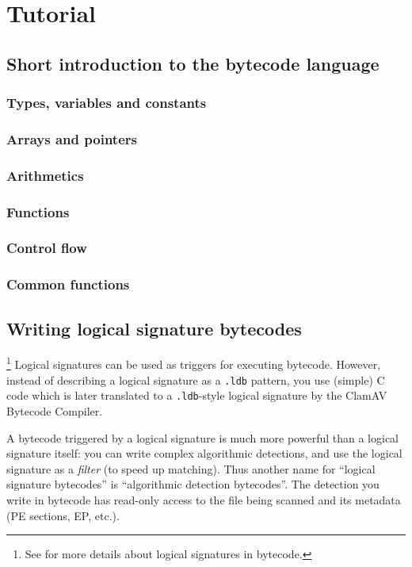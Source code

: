 \chapter{Tutorial}
\section{Short introduction to the bytecode language}
\subsection{Types, variables and constants}
\subsection{Arrays and pointers}
\subsection{Arithmetics}
\subsection{Functions}
\subsection{Control flow}
\subsection{Common functions}

\section[Writing logical signatures]{Writing logical signature bytecodes}
\footnote{See  for more details about logical signatures in
bytecode.}
Logical signatures can be used as triggers for executing bytecode.
However, instead of describing a logical signature as a \verb+.ldb+ pattern, you use (simple) C code which is later
translated to a \verb+.ldb+-style logical signature by the ClamAV Bytecode Compiler.

A bytecode triggered by a logical signature is much more powerful than a logical signature itself:
you can write complex algorithmic detections, and use the logical signature as a \emph{filter} (to speed up matching).
Thus another name for ``logical signature bytecodes'' is ``algorithmic detection bytecodes''.
The detection you write in bytecode has read-only access to the file being scanned and its metadata
(PE sections, EP, etc.).

